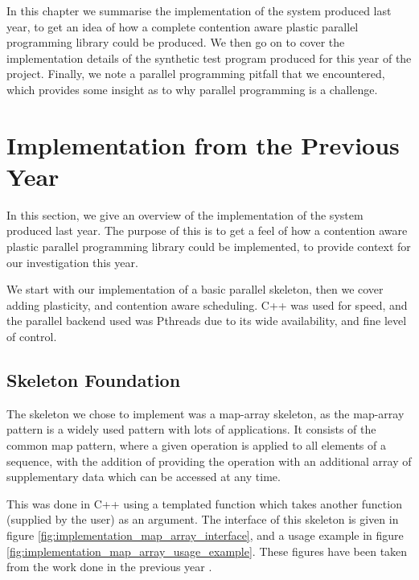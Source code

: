 
In this chapter we summarise the implementation of the system produced last year, to get an idea of how a complete contention aware plastic parallel programming library could be produced. We then go on to cover the implementation details of the synthetic test program produced for this year of the project. Finally, we note a parallel programming pitfall that we encountered, which provides some insight as to why parallel programming is a challenge.



\section{Implementation from the Previous Year}
\label{section:implementation:last_years_implementation}

In this section, we give an overview of the implementation of the system produced last year. The purpose of this is to get a feel of how a contention aware plastic parallel programming library could be implemented, to provide context for our investigation this year.

We start with our implementation of a basic parallel skeleton, then we cover adding plasticity, and contention aware scheduling. C++ was used for speed, and the parallel backend used was Pthreads due to its wide availability, and fine level of control. 



\subsection{Skeleton Foundation}
\label{section:implementation:skeleton_foundation}

The skeleton we chose to implement was a map-array skeleton, as the map-array pattern is a widely used pattern with lots of applications. It consists of the common map pattern, where a given operation is applied to all elements of a sequence, with the addition of providing the operation with an additional array of supplementary data which can be accessed at any time.

This was done in C++ using a templated function which takes another function (supplied by the user) as an argument. The interface of this skeleton is given in figure \ref{fig:implementation_map_array_interface}, and a usage example in figure \ref{fig:implementation_map_array_usage_example}. These figures have been taken from the work done in the previous year \cite{me}.



